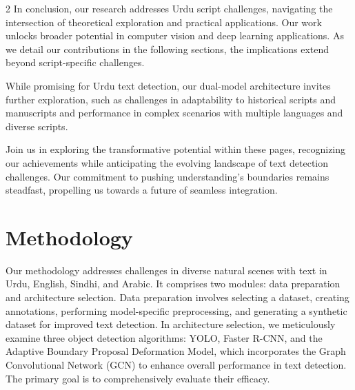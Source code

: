 \documentclass[sn-mathphys,Numbered]{sn-jnl}%
\begin{document}
\begin{multicols}{2}
In conclusion, our research addresses Urdu script challenges, navigating the intersection of theoretical exploration and practical applications. Our work unlocks broader potential in computer vision and deep learning applications. As we detail our contributions in the following sections, the implications extend beyond script-specific challenges.

While promising for Urdu text detection, our dual-model architecture invites further exploration, such as challenges in adaptability to historical scripts and manuscripts and performance in complex scenarios with multiple languages and diverse scripts.

Join us in exploring the transformative potential within these pages, recognizing our achievements while anticipating the evolving landscape of text detection challenges. Our commitment to pushing understanding's boundaries remains steadfast, propelling us towards a future of seamless integration.


\section{Methodology}
Our methodology addresses challenges in diverse natural scenes with text in Urdu, English, Sindhi, and Arabic. It comprises two modules: data preparation and architecture selection. Data preparation involves selecting a dataset, creating annotations, performing model-specific preprocessing, and generating a synthetic dataset for improved text detection. In architecture selection, we meticulously examine three object detection algorithms: YOLO, Faster R-CNN, and the Adaptive Boundary Proposal Deformation Model, which incorporates the Graph Convolutional Network (GCN) to enhance overall performance in text detection. The primary goal is to comprehensively evaluate their efficacy.


\end{multicols}
\end{document}
